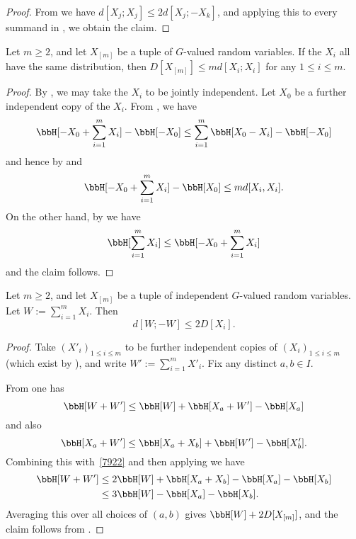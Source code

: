 \begin{proof}\leanok
From  we have $d[X_j;X_j] \leq 2 d[X_j;-X_k]$, and applying this to every summand in , we obtain the claim.
\end{proof}

\begin{lemma}\label{multidist-ruzsa-III}\leanok
  Let $m \ge 2$, and let $X_{[m]}$ be a tuple of $G$-valued random variables. If the $X_i$ all have the same distribution, then $D[X_{[m]}] \leq m d[X_i;X_i]$ for any $1 \leq i \leq m$.
\end{lemma}

\begin{proof}\leanok
  By ,  we may take the $X_i$ to be jointly independent.    Let $X_0$ be a further independent copy of the $X_i$.
From , we have
$$ \bbH[-X_0 + \sum_{i=1}^m X_i] - \bbH[-X_0] \leq \sum_{i=1}^m \bbH[X_0 - X_i] - \bbH[-X_0]$$
and hence by  and 
$$ \bbH[-X_0 + \sum_{i=1}^m X_i] - \bbH[X_0] \leq m d[X_i,X_i].$$
On the other hand, by  we have
$$ \bbH[\sum_{i=1}^m X_i] \leq \bbH[-X_0 + \sum_{i=1}^m X_i]$$
and the claim follows.
\end{proof}

\begin{lemma}\label{multidist-ruzsa-IV}\leanok
  Let $m \ge 2$, and let $X_{[m]}$ be a tuple of independent $G$-valued random variables.  Let $W := \sum_{i=1}^m X_i$. Then
  $$ d[W;-W] \leq 2 D[X_i].$$
\end{lemma}

\begin{proof}\leanok
  Take $(X'_i)_{1 \leq i \leq m}$ to be further independent copies of $(X_i)_{1 \leq i \leq m}$ (which exist by ), and write $W' := \sum_{i=1}^m X'_i$.
  Fix any distinct $a,b \in I$.

  From  one has
  \begin{equation}\label{7922}
    \bbH[W + W'] \leq  \bbH[W] + \bbH[X_{a} + W'] - \bbH[X_{a}]
   \end{equation}
   and also
   \[ \bbH[X_a + W'] \leq \bbH[X_a + X_b] + \bbH[W'] - \bbH[X'_b].\]
   Combining this with~\eqref{7922} and then applying  we have
   \begin{align*}  \bbH[W + W']  & \leq    2\bbH[W] + \bbH[X_a + X_b]  - \bbH[X_a] - \bbH[X_b] \\ & \leq
    3 \bbH[W] - \bbH[X_a] - \bbH[X_b].
  \end{align*}
  Averaging this over all choices of $(a,b)$ gives $\bbH[W] + 2 D[X_{[m]}]$, and the claim follows from .
\end{proof}

